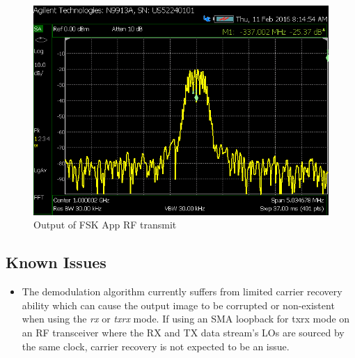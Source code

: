 \begin{figure}[ht]
\begin{minipage}{.45\textwidth}
			\centering\includegraphics[width=1.0\linewidth]{tx_spec_an}
			\caption{Output of FSK App RF transmit}
			\label{fig:tx_spec_an}
		\end{minipage}
	\end{figure}
\pagebreak
\subsection{Known Issues}
\noindent
\begin{itemize}
  \item  %
    The demodulation algorithm currently suffers from limited carrier
    recovery ability which can cause the output image to be corrupted or
    non-existent
    when using the \textit{rx} or \textit{txrx} mode.
    If using an SMA loopback for txrx mode
    on an RF transceiver where the RX and TX data stream's LOs are sourced by
    the same clock, carrier recovery is not
    expected to be an issue.

\end{itemize}


